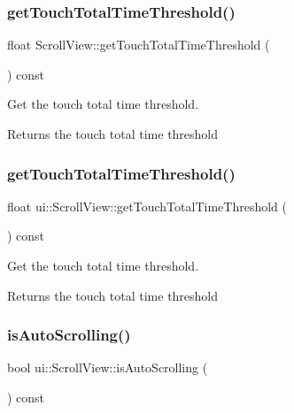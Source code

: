\subsubsection{\texorpdfstring{get\+Touch\+Total\+Time\+Threshold()}{getTouchTotalTimeThreshold()}\hspace{0.1cm}{\footnotesize\ttfamily [1/2]}}
{\footnotesize\ttfamily float Scroll\+View\+::get\+Touch\+Total\+Time\+Threshold (\begin{DoxyParamCaption}{ }\end{DoxyParamCaption}) const}



Get the touch total time threshold. 

\begin{DoxyReturn}{Returns}
the touch total time threshold 
\end{DoxyReturn}
\mbox{\label{classui_1_1ScrollView_ab4d03d2ed9f34c127f7080c900a880d0}} 
\subsubsection{\texorpdfstring{get\+Touch\+Total\+Time\+Threshold()}{getTouchTotalTimeThreshold()}\hspace{0.1cm}{\footnotesize\ttfamily [2/2]}}
{\footnotesize\ttfamily float ui\+::\+Scroll\+View\+::get\+Touch\+Total\+Time\+Threshold (\begin{DoxyParamCaption}{ }\end{DoxyParamCaption}) const}



Get the touch total time threshold. 

\begin{DoxyReturn}{Returns}
the touch total time threshold 
\end{DoxyReturn}
\mbox{\label{classui_1_1ScrollView_a24c6d5d48597092d65e0e25edf4f07e0}} 
\subsubsection{\texorpdfstring{is\+Auto\+Scrolling()}{isAutoScrolling()}}
{\footnotesize\ttfamily bool ui\+::\+Scroll\+View\+::is\+Auto\+Scrolling (\begin{DoxyParamCaption}{ }\end{DoxyParamCaption}) const\hspace{0.3cm}{\ttfamily [inline]}}

